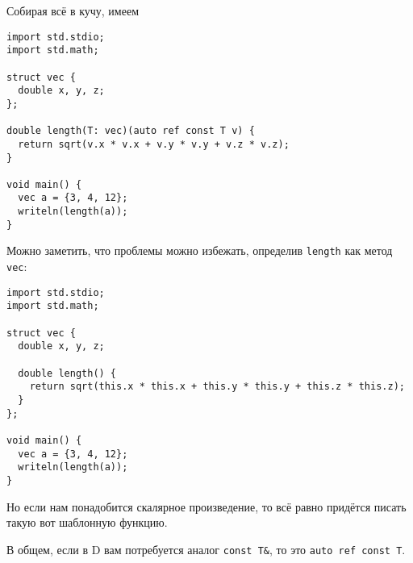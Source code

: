 \documentclass{ncc}
\begin{document}
Собирая всё в кучу, имеем
\begin{verbatim}
import std.stdio;
import std.math;

struct vec {
  double x, y, z;
};

double length(T: vec)(auto ref const T v) {
  return sqrt(v.x * v.x + v.y * v.y + v.z * v.z);
}

void main() {
  vec a = {3, 4, 12};
  writeln(length(a));
}
\end{verbatim}

Можно заметить, что проблемы можно избежать, определив \texttt{length} как метод \texttt{vec}:
\begin{verbatim}
import std.stdio;
import std.math;

struct vec {
  double x, y, z;

  double length() {
    return sqrt(this.x * this.x + this.y * this.y + this.z * this.z);
  }
};

void main() {
  vec a = {3, 4, 12};
  writeln(length(a));
}
\end{verbatim}
Но если нам понадобится скалярное произведение, то всё равно придётся писать такую вот шаблонную функцию.

В общем, если в D вам потребуется аналог \texttt{const~T\&}, то это \texttt{auto~ref~const~T}.
\end{document}
